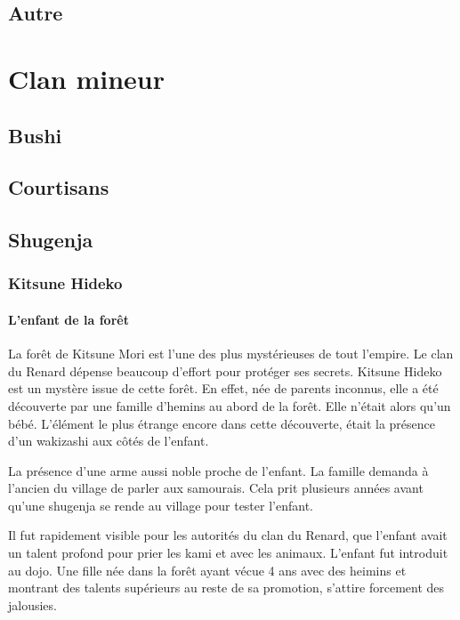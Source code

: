\documentclass[10pt,a4paper]{book}
\begin{document}
\section{Autre}


\chapter{Clan mineur}

\section{Bushi}

\section{Courtisans}

\section{Shugenja}

\subsection{Kitsune Hideko}
\subsubsection*{L’enfant de la forêt}

La forêt de Kitsune Mori est l’une des plus mystérieuses de tout l’empire. 
Le clan du Renard dépense beaucoup d’effort pour protéger ses secrets. 
Kitsune Hideko est un mystère issue de cette forêt. En effet, née de parents inconnus, elle a été découverte par une famille d’hemins au abord de la forêt. Elle n’était alors qu’un bébé. L’élément le plus étrange encore dans cette découverte, était la présence d’un wakizashi aux côtés de l’enfant.

La présence d’une arme aussi noble proche de l’enfant. La famille demanda à l’ancien du village de parler aux samourais. Cela prit plusieurs années avant qu’une shugenja se rende au village pour tester l’enfant.

Il fut rapidement visible pour les autorités du clan du Renard, que l’enfant avait un talent profond pour prier les kami et avec les animaux. L’enfant fut introduit au dojo. Une fille née dans la forêt ayant vécue 4 ans avec des heimins et montrant des talents supérieurs au reste de sa promotion, s’attire forcement des jalousies. 
\end{document}
